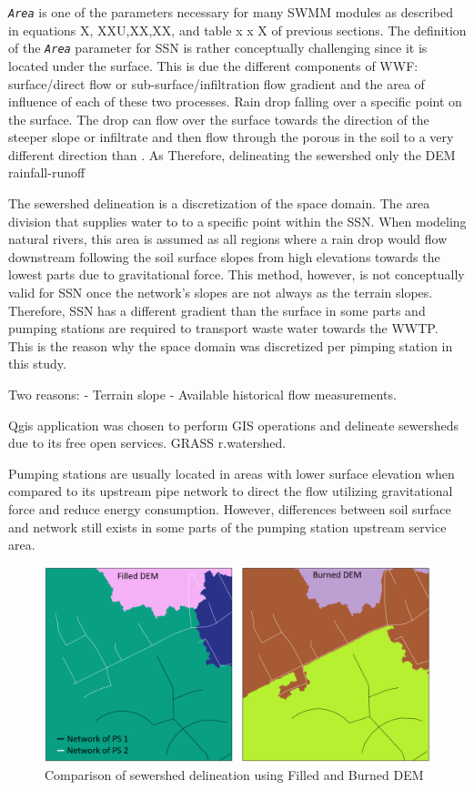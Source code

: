 \texttt{\textit{Area}} is one of the parameters necessary for many SWMM modules as described in equations X, XXU,XX,XX, and table x x X of previous sections. The definition of the \texttt{\textit{Area}} parameter for \acf{SSN} is rather conceptually challenging since it is located under the surface. This is due the different components of \ac{WWF}: surface/direct flow or sub-surface/infiltration flow gradient and the area of influence of each of these two processes. Rain drop falling over a specific point on the surface. The drop can flow over the surface towards the direction of the steeper slope or infiltrate and then flow through the porous in the soil to a very different direction than . As 
Therefore, delineating the sewershed only the \acf{DEM} rainfall-runoff

The sewershed delineation is a discretization of the space domain. The area division that supplies water to to a specific point within the \ac{SSN}. When modeling natural rivers, this area is assumed as all regions where a rain drop would flow downstream following the soil surface slopes from high elevations towards the lowest parts due to gravitational force. This method, however, is not conceptually valid for \ac{SSN} once the network's slopes are not always as the terrain slopes. Therefore, \ac{SSN} has a different gradient than the surface in some parts and pumping stations are required to transport waste water towards the \acf{WWTP}. This is the reason why the space domain was discretized per pimping station in this study.


Two reasons:
- Terrain slope
- Available historical flow measurements.

Qgis application was chosen to perform GIS operations and delineate sewersheds due to its free open services. GRASS r.watershed. 


Pumping stations are usually located in areas with lower surface elevation when compared to its upstream pipe network to direct the flow utilizing gravitational force and reduce energy consumption. However, differences between soil surface and network still exists in some parts of the pumping station upstream service area. 


\begin{figure}[h]
    \centering
	\includegraphics[scale=0.6]{figures/burnedxfilledDEM.png}
	\caption{Comparison of sewershed delineation using Filled and Burned DEM}
	\label{fig:filledxburned}
\end{figure}


